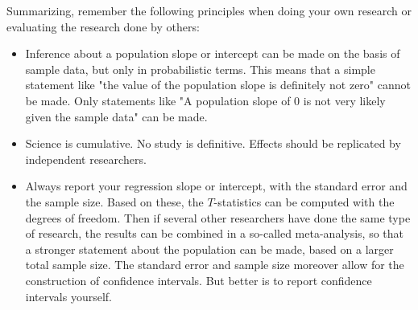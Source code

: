 \documentclass[]{book}\usepackage[]{graphicx}\usepackage[]{color}
\begin{document}
Summarizing, remember the following principles when doing your own research or evaluating the research done by others:

\begin{itemize}

\item Inference about a population slope or intercept can be made on the basis of sample data, but only in probabilistic terms. This means that a simple statement like "the value of the population slope is definitely not zero" cannot be made. Only statements like "A population slope of 0 is not very likely given the sample data" can be made.

\item Science is cumulative. No study is definitive. Effects should be replicated by independent researchers.

\item Always report your regression slope or intercept, with the standard error and the sample size. Based on these, the $T$-statistics can be computed with the degrees of freedom. Then if several other researchers have done the same type of research, the results can be combined in a so-called meta-analysis, so that a stronger statement about the population can be made, based on a larger total sample size. The standard error and sample size moreover allow for the construction of confidence intervals. But better is to report confidence intervals yourself.

\end{itemize}



% 
% 
\end{document}
